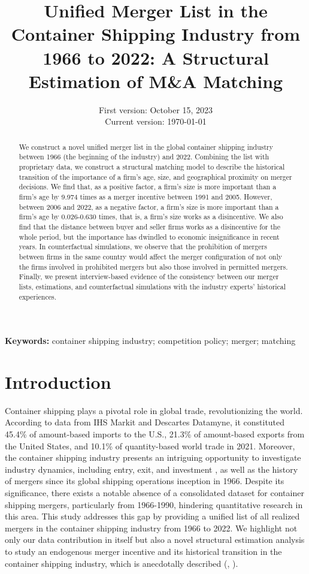 \documentclass[10pt]{article}
\title{Unified Merger List in the Container Shipping Industry from 1966 to 2022: A Structural Estimation of M\&A Matching}
\date{
First version: October 15, 2023\\
Current version: \today
}
\begin{document}
\maketitle

\begin{abstract}
We construct a novel unified merger list in the global container shipping industry between 1966 (the beginning of the industry) and 2022. Combining the list with proprietary data, we construct a structural matching model to describe the historical transition of the importance of a firm's age, size, and geographical proximity on merger decisions. 
We find that, as a positive factor, a firm's size is more important than a firm's age by 9.974 times as a merger incentive between 1991 and 2005.
However, between 2006 and 2022, as a negative factor, a firm's size is more important than a firm's age by 0.026-0.630 times, that is, a firm's size works as a disincentive.
We also find that the distance between buyer and seller firms works as a disincentive for the whole period, but the importance has dwindled to economic insignificance in recent years. 
In counterfactual simulations, we observe that the prohibition of mergers between firms in the same country would affect the merger configuration of not only the firms involved in prohibited mergers but also those involved in permitted mergers.
Finally, we present interview-based evidence of the consistency between our merger lists, estimations, and counterfactual simulations with the industry experts' historical experiences.

\end{abstract} 

\vspace{0.1in}
\noindent\textbf{Keywords:} container shipping industry; competition policy; merger; matching 
\vspace{0in}


\section{Introduction}

Container shipping plays a pivotal role in global trade, revolutionizing the world. According to data from IHS Markit and Descartes Datamyne, it constituted 45.4\% of amount-based imports to the U.S., 21.3\% of amount-based exports from the United States, and 10.1\% of quantity-based world trade in 2021.
Moreover, the container shipping industry presents an intriguing opportunity to investigate industry dynamics, including entry, exit, and investment \citep{otani2023industry}, as well as the history of mergers since its global shipping operations inception in 1966.
Despite its significance, there exists a notable absence of a consolidated dataset for container shipping mergers, particularly from 1966-1990, hindering quantitative research in this area. 
This study addresses this gap by providing a unified list of all realized mergers in the container shipping industry from 1966 to 2022.
We highlight not only our data contribution in itself but also a novel structural estimation analysis to study an endogenous merger incentive and its historical transition in the container shipping industry, which is anecdotally described (\cite{broeze2002globalisation}, \cite{levinson2016box}).
\end{document}

